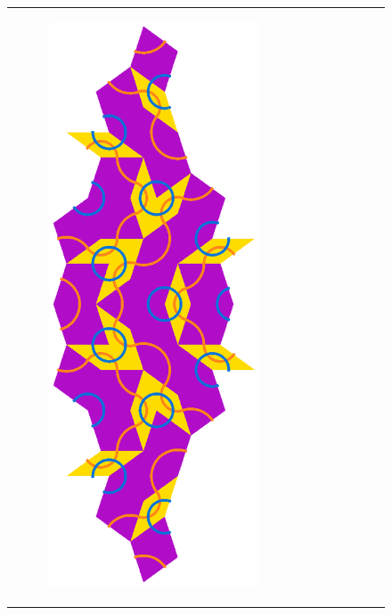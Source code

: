 \documentclass[
  oneside,
  11pt, a4paper,
  footinclude=true,
  headinclude=true,
  cleardoublepage=empty
]{scrbook}
\begin{document}
\begin{figure}[H]
\begin{tabular}{cc}
\begin{subfigure}[b]{0.4\textwidth}
             \centering
             \includegraphics[scale=0.4]{SkinnyInflation4}
             \end{subfigure}   &
             \begin{subfigure}[b]{0.4\textwidth}

\end{subfigure}
\end{tabular}
\end{figure}
\end{document}
